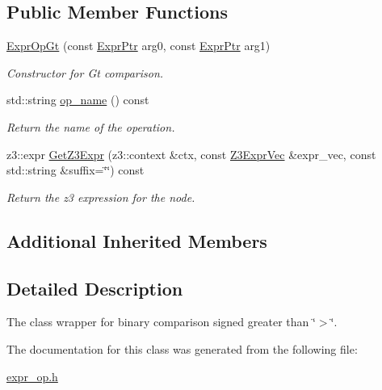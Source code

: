 \subsection*{Public Member Functions}
\begin{DoxyCompactItemize}
\item 
\mbox{\label{classilang_1_1_expr_op_gt_a6809a1a351c59396994a69f30152250f}} 
\mbox{\hyperlink{classilang_1_1_expr_op_gt_a6809a1a351c59396994a69f30152250f}{Expr\+Op\+Gt}} (const \mbox{\hyperlink{classilang_1_1_expr_a85952b6a34620c4c8cab6bac9c9fdf8c}{Expr\+Ptr}} arg0, const \mbox{\hyperlink{classilang_1_1_expr_a85952b6a34620c4c8cab6bac9c9fdf8c}{Expr\+Ptr}} arg1)
\begin{DoxyCompactList}\small\item\em Constructor for Gt comparison. \end{DoxyCompactList}\item 
\mbox{\label{classilang_1_1_expr_op_gt_a44fd02d2744804efb3f54cef0273553f}} 
std\+::string \mbox{\hyperlink{classilang_1_1_expr_op_gt_a44fd02d2744804efb3f54cef0273553f}{op\+\_\+name}} () const
\begin{DoxyCompactList}\small\item\em Return the name of the operation. \end{DoxyCompactList}\item 
\mbox{\label{classilang_1_1_expr_op_gt_ae81b129a316d01cfc09ab8e4bfca10e0}} 
z3\+::expr \mbox{\hyperlink{classilang_1_1_expr_op_gt_ae81b129a316d01cfc09ab8e4bfca10e0}{Get\+Z3\+Expr}} (z3\+::context \&ctx, const \mbox{\hyperlink{namespaceilang_adc4eee919aa24fff882d03a48d733c19}{Z3\+Expr\+Vec}} \&expr\+\_\+vec, const std\+::string \&suffix=\char`\"{}\char`\"{}) const
\begin{DoxyCompactList}\small\item\em Return the z3 expression for the node. \end{DoxyCompactList}\end{DoxyCompactItemize}
\subsection*{Additional Inherited Members}


\subsection{Detailed Description}
The class wrapper for binary comparison signed greater than \char`\"{}$>$\char`\"{}. 

The documentation for this class was generated from the following file\+:\begin{DoxyCompactItemize}
\item 
\mbox{\hyperlink{expr__op_8h}{expr\+\_\+op.\+h}}\end{DoxyCompactItemize}
